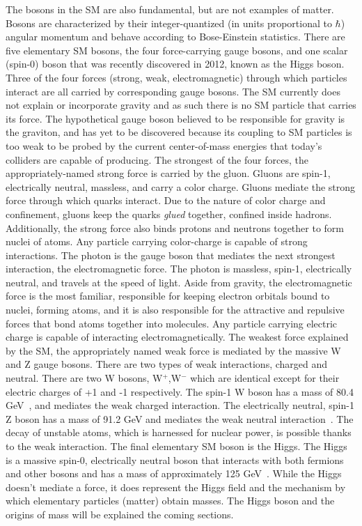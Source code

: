 The bosons in the SM are also fundamental, but are not examples of matter. Bosons are characterized by their integer-quantized (in units proportional to $\hbar$) angular momentum and behave according to Bose-Einstein statistics. There are five elementary SM bosons, the four force-carrying gauge
bosons, and one scalar (spin-0) boson that was recently discovered in 2012, known as the Higgs boson. Three of the four forces (strong, weak, electromagnetic) through which particles interact are all
carried by corresponding gauge bosons. The SM currently does not explain or incorporate gravity and as such there is no SM particle that carries its force. The hypothetical gauge boson believed to be responsible for gravity is the graviton,
and has yet to be discovered because its coupling to SM particles is too weak to be probed by the current center-of-mass energies that today's colliders are capable of producing.
The strongest of the four forces, the appropriately-named strong force is carried by the gluon. Gluons are spin-1, electrically neutral, massless, and carry a color charge. Gluons mediate the strong force through which quarks interact. Due to the nature of
color charge and confinement, gluons keep the quarks \emph{glued} together, confined inside hadrons. Additionally, the strong force also binds protons and neutrons together to form nuclei of atoms. Any particle carrying color-charge
is capable of strong interactions. 
The photon is the gauge boson that mediates the next strongest interaction, the electromagnetic force. The photon is massless, spin-1, electrically neutral, and travels at the speed of light. Aside from gravity, the electromagnetic force is the most familiar,
responsible for keeping electron orbitals bound to nuclei, forming atoms, and it is also responsible for the attractive and repulsive forces that bond atoms together into molecules. Any particle carrying electric charge is capable of interacting electromagnetically.
The weakest force explained by the SM, the appropriately named weak force is mediated by the massive W and Z gauge bosons. There are two types of weak interactions, charged and neutral.
There are two W bosons, W$^+$,W$^-$ which are identical except for their electric charges of +1 and -1 respectively. The spin-1 W boson has a mass of 80.4 GeV~\cite{pdg}, and mediates the weak charged interaction.
The electrically neutral, spin-1 Z boson has a mass of 91.2 GeV and mediates the weak neutral interaction~\cite{pdg}. The decay of unstable atoms, which is harnessed for nuclear power, is possible thanks to the weak interaction.
The final elementary SM boson is the Higgs. The Higgs is a massive spin-0, electrically neutral boson that interacts with both fermions and other bosons and has a mass of approximately 125 GeV~\cite{pdg}. While the Higgs doesn't mediate a force,
it does represent the Higgs field and the
mechanism by which elementary particles (matter) obtain masses. The Higgs boson and the origins of mass will be explained the coming sections. 

